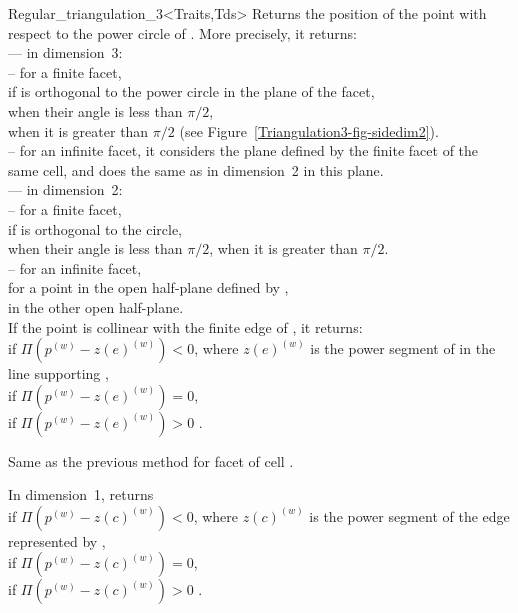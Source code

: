 \begin{ccClassTemplate}{Regular_triangulation_3<Traits,Tds>}
{Returns the position of the point  with respect to the
power circle of . More precisely, it returns:\\
--- in dimension~3:\\
-- for a finite facet,\\
 if  is orthogonal to the power circle in the
plane of the facet,\\ 
 when their angle is less than $\pi/2$,\\
 when it is greater than $\pi/2$ (see
Figure~\ref{Triangulation3-fig-sidedim2}).\\ 
-- for an infinite facet, it considers the plane defined by the finite
facet of the same cell, and does the same as in dimension~2 in this
plane.\\
--- in dimension~2:\\
-- for a finite facet,\\
 if  is orthogonal to the circle,\\
 when their angle is less than $\pi/2$,
 when it is greater than $\pi/2$.\\ 
-- for an infinite facet,\\
 for a point in the open half-plane defined by
,\\
 in the other open half-plane.\\
If the point  is collinear with the finite edge  of
, it returns:\\
 if $\Pi({p}^{(w)}-{z(e)}^{(w)})<0$, where
${z(e)}^{(w)}$ is the power segment of  in the line supporting
,\\ 
 if $\Pi({p}^{(w)}-{z(e)}^{(w)})=0$,\\
 if $\Pi({p}^{(w)}-{z(e)}^{(w)})>0$ .
}

{Same as the previous method for facet  of cell .}

{In dimension~1, returns\\
 if $\Pi({p}^{(w)}-{z(c)}^{(w)})<0$, where
${z(c)}^{(w)}$ is the power segment of the edge represented by
,\\
 if $\Pi({p}^{(w)}-{z(c)}^{(w)})=0$,\\
 if $\Pi({p}^{(w)}-{z(c)}^{(w)})>0$ .
}


\end{ccClassTemplate}
